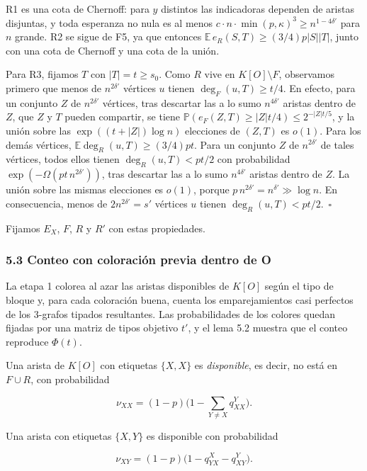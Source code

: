\documentclass[spanish,11pt,a4paper]{article}
\begin{document}
R1 es una cota de Chernoff: para \(y\) distintos las indicadoras dependen de aristas disjuntas, y toda esperanza no nula es al menos \(c\cdot n\cdot\min(p,\kappa)^3\ge n^{1-4\delta'}\) para \(n\) grande. R2 se sigue de F5, ya que entonces \(\mathbb E\,e_R(S,T)\ge(3/4)p|S||T|\), junto con una cota de Chernoff y una cota de la unión.

Para R3, fijamos \(T\) con \(|T|=t\ge s_0\). Como \(R\) vive en \(K[O]\setminus F\), observamos primero que menos de \(n^{2\delta'}\) vértices \(u\) tienen \(\deg_F(u,T)\ge t/4\). En efecto, para un conjunto \(Z\) de \(n^{2\delta'}\) vértices, tras descartar las a lo sumo \(n^{4\delta'}\) aristas dentro de \(Z\), que \(Z\) y \(T\) pueden compartir, se tiene \(\mathbb P(e_F(Z,T)\ge|Z|t/4)\le2^{-|Z|t/5}\), y la unión sobre las \(\exp((t+|Z|)\log n)\) elecciones de \((Z,T)\) es \(o(1)\). Para los demás vértices, \(\mathbb E\deg_R(u,T)\ge(3/4)pt\). Para un conjunto \(Z\) de \(n^{2\delta'}\) de tales vértices, todos ellos tienen \(\deg_R(u,T)<pt/2\) con probabilidad \(\exp(-\Omega(pt\,n^{2\delta'}))\), tras descartar las a lo sumo \(n^{4\delta'}\) aristas dentro de \(Z\). La unión sobre las mismas elecciones es \(o(1)\), porque \(p\,n^{2\delta'}=n^{\delta'}\gg\log n\). En consecuencia, menos de \(2n^{2\delta'}=s'\) vértices \(u\) tienen \(\deg_R(u,T)<pt/2\).~\(\square\)

Fijamos \(E_X\), \(F\), \(R\) y \(R'\) con estas propiedades.

\subsubsection{5.3 Conteo con coloración previa dentro de O}\label{conteo-con-coloraciuxf3n-previa-dentro-de-o}

La etapa 1 colorea al azar las aristas disponibles de \(K[O]\) según el tipo de bloque y, para cada coloración buena, cuenta los emparejamientos casi perfectos de los 3-grafos tipados resultantes. Las probabilidades de los colores quedan fijadas por una matriz de tipos objetivo \(t'\), y el lema 5.2 muestra que el conteo reproduce \(\Phi(t)\).

Una arista de \(K[O]\) con etiquetas \(\{X,X\}\) es \emph{disponible}, es decir, no está en \(F\cup R\), con probabilidad

\nopagebreak[4]
\[\nu_{XX}=(1-p)\Big(1-\sum_{Y\ne X}q^Y_{XX}\Big).\]

Una arista con etiquetas \(\{X,Y\}\) es disponible con probabilidad

\nopagebreak[4]
\[\nu_{XY}=(1-p)\big(1-q^X_{YX}-q^Y_{XY}\big).\]
\end{document}
